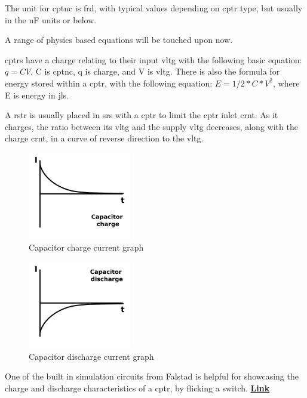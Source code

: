 \documentclass[a4paper,11pt]{report}
\let\oldhref\href %
\renewcommand{\href}[2]{\oldhref{#1}{\bfseries#2}}
\begin{document}
The unit for \gls{cptnc} is \gls{frd}, with typical values depending on \gls{cptr} type, but usually in the uF units or below.

A range of physics based equations will be touched upon now.

\gls{cptr}s have a charge relating to their input \gls{vltg} with the following basic equation: $q = CV$.  C is \gls{cptnc}, q is charge, and V is \gls{vltg}. There is also the formula for energy stored within a \gls{cptr}, with the following equation: $E = 1/2*C*V^2$, where E is energy in \gls{jls}.

A \gls{rstr} is usually placed in \gls{srs} with a \gls{cptr} to limit the \gls{cptr} inlet \gls{crnt}. As it charges, the ratio between its \gls{vltg} and the supply \gls{vltg} decreases, along with the charge \gls{crnt}, in a curve of reverse direction to the \gls{vltg}.

\begin{figure}[H]
\centering
\includegraphics[width=0.4\textwidth]{capacitorchargecurrent}
\caption{Capacitor charge current graph}
\end{figure}

\begin{figure}[H]
\centering
\includegraphics[width=0.4\textwidth]{capacitordischargecurrent}
\caption{Capacitor discharge current graph}
\end{figure}

One of the built in simulation circuits from Falstad is helpful for showcasing the charge and discharge characteristics of a \gls{cptr}, by flicking a switch. \href{https://tinyurl.com/2erbz4jy}{Link}
\end{document}
